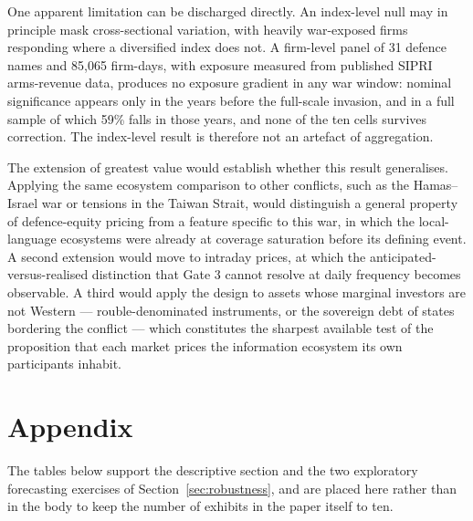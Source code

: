 \documentclass[12pt,a4paper]{article}
\begin{document}
One apparent limitation can be discharged directly. An index-level null may in principle mask cross-sectional variation, with heavily war-exposed firms responding where a diversified index does not. A firm-level panel of 31 defence names and 85,065 firm-days, with exposure measured from published SIPRI arms-revenue data, produces no exposure gradient in any war window: nominal significance appears only in the years before the full-scale invasion, and in a full sample of which 59\% falls in those years, and none of the ten cells survives correction. The index-level result is therefore not an artefact of aggregation.

The extension of greatest value would establish whether this result generalises. Applying the same ecosystem comparison to other conflicts, such as the Hamas--Israel war or tensions in the Taiwan Strait, would distinguish a general property of defence-equity pricing from a feature specific to this war, in which the local-language ecosystems were already at coverage saturation before its defining event. A second extension would move to intraday prices, at which the anticipated-versus-realised distinction that Gate 3 cannot resolve at daily frequency becomes observable. A third would apply the design to assets whose marginal investors are not Western --- rouble-denominated instruments, or the sovereign debt of states bordering the conflict --- which constitutes the sharpest available test of the proposition that each market prices the information ecosystem its own participants inhabit.

\newpage


\newpage
\appendix
\section{Appendix}

The tables below support the descriptive section and the two exploratory
forecasting exercises of Section~\ref{sec:robustness}, and are placed here
rather than in the body to keep the number of exhibits in the paper itself
to ten.
\end{document}
